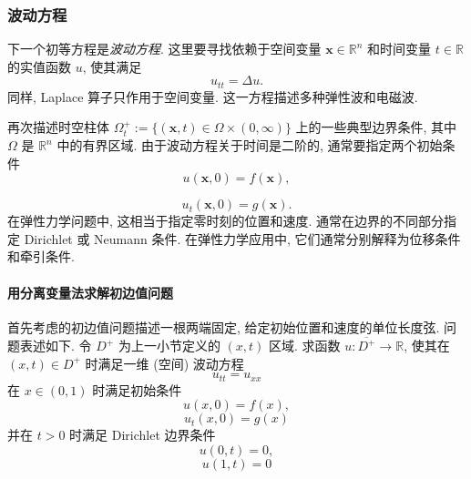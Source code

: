 \subsubsection{波动方程}\label{subsec:wave-equation}

下一个初等方程是\emph{波动方程}. 这里要寻找依赖于空间变量 $\bm{x}\in\mathbb{R}^n$ 和时间变量 $t\in\mathbb{R}$ 的实值函数 $u$, 使其满足
\begin{equation}\label{eq:wave-general}
u_{tt}=\Delta u.
\end{equation}
同样, Laplace 算子只作用于空间变量. 这一方程描述多种弹性波和电磁波.

再次描述时空柱体 $\Omega_t^+:=\{(\bm{x},t)\in\Omega\times(0,\infty)\}$ 上的一些典型边界条件, 其中 $\Omega$ 是 $\mathbb{R}^n$ 中的有界区域. 由于波动方程关于时间是二阶的, 通常要指定两个初始条件
\begin{equation}\label{eq:wave-general-initial-position}
u(\bm{x},0)=f(\bm{x}),
\end{equation}

\begin{equation}\label{eq:wave-general-initial-velocity}
u_t(\bm{x},0)=g(\bm{x}).
\end{equation}
在弹性力学问题中, 这相当于指定零时刻的位置和速度. 通常在边界的不同部分指定 Dirichlet 或 Neumann 条件. 在弹性力学应用中, 它们通常分别解释为位移条件和牵引条件.

\paragraph*{用分离变量法求解初边值问题}

首先考虑的初边值问题描述一根两端固定, 给定初始位置和速度的单位长度弦. 问题表述如下. 令 $D^+$ 为上一小节定义的 $(x,t)$ 区域. 求函数 $u:\overline{D^+}\to\mathbb{R}$, 使其在 $(x,t)\in D^+$ 时满足一维 (空间) 波动方程
\begin{equation}\label{eq:wave-one-dimensional}
u_{tt}=u_{xx}
\end{equation}
在 $x\in(0,1)$ 时满足初始条件
\begin{equation}\label{eq:wave-interval-initial-position}
u(x,0)=f(x),
\end{equation}
\begin{equation}\label{eq:wave-interval-initial-velocity}
u_t(x,0)=g(x)
\end{equation}
并在 $t>0$ 时满足 Dirichlet 边界条件
\begin{equation}\label{eq:wave-left-boundary}
u(0,t)=0,
\end{equation}
\begin{equation}\label{eq:wave-right-boundary}
u(1,t)=0
\end{equation}


